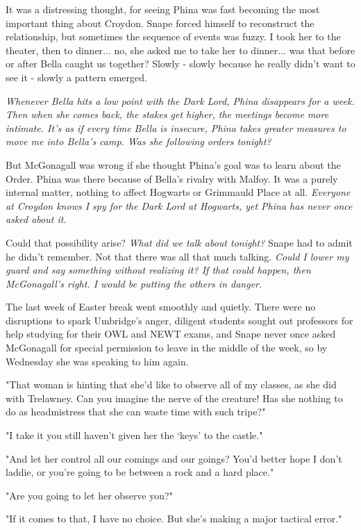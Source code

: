 \documentclass[a4paper,11pt]{article}
\begin{document}
It was a distressing thought, for seeing Phina was fast becoming the most important thing about Croydon. Snape forced himself to reconstruct the relationship, but sometimes the sequence of events was fuzzy. I took her to the theater, then to dinner... no, she asked me to take her to dinner... was that before or after Bella caught us together? Slowly - slowly because he really didn't want to see it - slowly a pattern emerged.

\emph{Whenever Bella hits a low point with the Dark Lord, Phina disappears for a week. Then when she comes back, the stakes get higher, the meetings become more intimate. It's as if every time Bella is insecure, Phina takes greater measures to move me into Bella's camp. Was she following orders tonight?}

But McGonagall was wrong if she thought Phina's goal was to learn about the Order. Phina was there because of Bella's rivalry with Malfoy. It was a purely internal matter, nothing to affect Hogwarts or Grimmauld Place at all. \emph{Everyone at Croydon knows I spy for the Dark Lord at Hogwarts, yet Phina has never once asked about it.}

Could that possibility arise? \emph{What did we talk about tonight?} Snape had to admit he didn't remember. Not that there was all that much talking. \emph{Could I lower my guard and say something without realizing it? If that could happen, then McGonagall's right. I would be putting the others in danger.}

The last week of Easter break went smoothly and quietly. There were no disruptions to spark Umbridge's anger, diligent students sought out professors for help studying for their OWL and NEWT exams, and Snape never once asked McGonagall for special permission to leave in the middle of the week, so by Wednesday she was speaking to him again.

"That woman is hinting that she'd like to observe all of my classes, as she did with Trelawney. Can you imagine the nerve of the creature! Has she nothing to do as headmistress that she can waste time with such tripe?"

"I take it you still haven't given her the `keys' to the castle."

"And let her control all our comings and our goings? You'd better hope I don't laddie, or you're going to be between a rock and a hard place."

"Are you going to let her observe you?"

"If it comes to that, I have no choice. But she's making a major tactical error."
\end{document}
